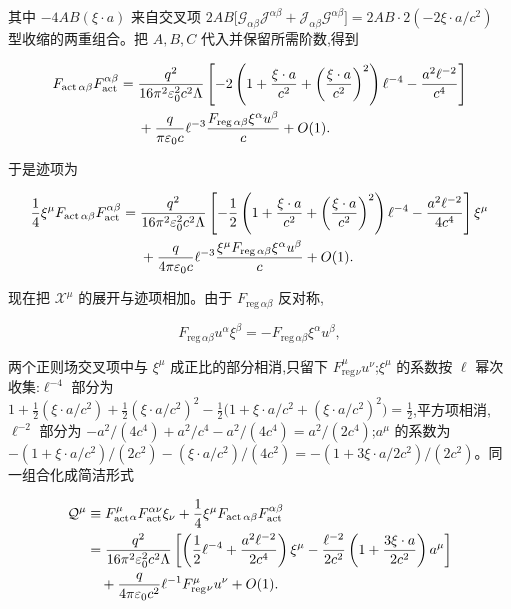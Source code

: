 其中 $-4AB(\xi\cdot a)$ 来自交叉项 $2AB\bigl[\mathcal G_{\alpha\beta}\mathcal J^{\alpha\beta}+\mathcal J_{\alpha\beta}\mathcal G^{\alpha\beta}\bigr]=2AB\cdot2(-2\xi\cdot a/c^2)$ 型收缩的两重组合。把 $A,B,C$ 代入并保留所需阶数,得到

\begin{align*}
 F_{\mathrm{act}\,\alpha\beta}F_{\mathrm{act}}^{\alpha\beta}
 ={}&{q^2\over16\pi^2\varepsilon_0^2c^2\Lambda}
 \left[
 -2\left(1+{\xi\cdot a\over c^2}
 +\left({\xi\cdot a\over c^2}\right)^2\right)\ell^{-4}
 -{a^2\ell^{-2}\over c^4}
 \right]\\
 &+{q\over\pi\varepsilon_0c}\ell^{-3}
 {F_{\mathrm{reg}\,\alpha\beta}\xi^\alpha u^\beta\over c}
 +O(1).
\end{align*}

于是迹项为

\begin{align*}
 {1\over4}\xi^\mu
 F_{\mathrm{act}\,\alpha\beta}F_{\mathrm{act}}^{\alpha\beta}
 ={}&{q^2\over16\pi^2\varepsilon_0^2c^2\Lambda}
 \left[
 -{1\over2}
 \left(1+{\xi\cdot a\over c^2}
 +\left({\xi\cdot a\over c^2}\right)^2\right)\ell^{-4}
 -{a^2\ell^{-2}\over4c^4}
 \right]\xi^\mu\\
 &+{q\over4\pi\varepsilon_0c}\ell^{-3}
 {\xi^\mu F_{\mathrm{reg}\,\alpha\beta}\xi^\alpha u^\beta\over c}
 +O(1).
\end{align*}

现在把 $\mathcal X^\mu$ 的展开与迹项相加。由于 $F_{\mathrm{reg}\,\alpha\beta}$ 反对称,

\begin{equation*}
 F_{\mathrm{reg}\,\alpha\beta}u^\alpha\xi^\beta
 =-F_{\mathrm{reg}\,\alpha\beta}\xi^\alpha u^\beta,
\end{equation*}

两个正则场交叉项中与 $\xi^\mu$ 成正比的部分相消,只留下 $F_{\mathrm{reg}}^\mu{}_\nu u^\nu$;$\xi^\mu$ 的系数按 $\ell$ 幂次收集:$\ell^{-4}$ 部分为 $1+\frac12(\xi\cdot a/c^2)+\frac12(\xi\cdot a/c^2)^2-\frac12\bigl(1+\xi\cdot a/c^2+(\xi\cdot a/c^2)^2\bigr)=\frac12$,平方项相消,$\ell^{-2}$ 部分为 $-a^2/(4c^4)+a^2/c^4-a^2/(4c^4)=a^2/(2c^4)$;$a^\mu$ 的系数为 $-(1+\xi\cdot a/c^2)/(2c^2)-(\xi\cdot a/c^2)/(4c^2)=-(1+3\xi\cdot a/2c^2)/(2c^2)$。同一组合化成简洁形式

\begin{align*}
 \mathcal Q^\mu
 &\equiv
 F_{\mathrm{act}}^\mu{}_\alpha
 F_{\mathrm{act}}^{\alpha\nu}\xi_\nu
 +{1\over4}\xi^\mu
 F_{\mathrm{act}\,\alpha\beta}F_{\mathrm{act}}^{\alpha\beta}\\
 &={q^2\over16\pi^2\varepsilon_0^2c^2\Lambda}
 \left[
 \left({1\over2}\ell^{-4}
 +{a^2\ell^{-2}\over2c^4}\right)\xi^\mu
 -{\ell^{-2}\over2c^2}
 \left(1+{3\xi\cdot a\over2c^2}\right)a^\mu
 \right]\\
 &\quad
 +{q\over4\pi\varepsilon_0c^2}\ell^{-1}
 F_{\mathrm{reg}}^\mu{}_\nu u^\nu
 +O(1).
\end{align*}

